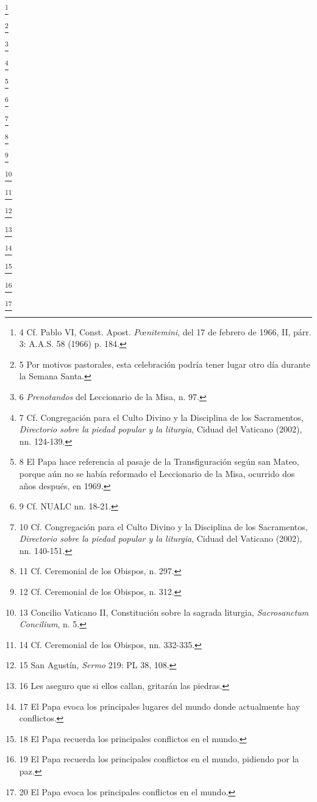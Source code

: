 					\footnote{4 Cf. Pablo VI, Const. Apost. \textit{P}œ\textit{nitemini}, del 17 de febrero de 1966, II, párr. 3: A.A.S. 58 (1966) p. 184.}
			
					\footnote{5 Por motivos pastorales, esta celebración podría tener lugar otro día durante la Semana Santa.}
			
					\footnote{6 \textit{Prenotandos} del Leccionario de la Misa, n. 97.}
			
					\footnote{7 Cf. Congregación para el Culto Divino y la Disciplina de los Sacramentos, \textit{Directorio sobre la piedad popular y la liturgia}, Ciduad del Vaticano (2002), nn. 124-139.}
			
					\footnote{8 El Papa hace referencia al pasaje de la Transfiguración según san Mateo, porque aún no se había reformado el Leccionario de la Misa, ocurrido dos años después, en 1969.}
			
					\footnote{9 Cf. NUALC nn. 18-21.}
			
					\footnote{10 Cf. Congregación para el Culto Divino y la Disciplina de los Sacramentos, \textit{Directorio sobre la piedad popular y la liturgia}, Ciduad del Vaticano (2002), nn. 140-151.}
			
					\footnote{11 Cf. Ceremonial de los Obispos, n. 297.}
			
					\footnote{12 Cf. Ceremonial de los Obispos, n. 312.}
			
					\footnote{13 Concilio Vaticano II, Constitución sobre la sagrada liturgia, \textit{Sacrosanctum Concilium}, n. 5.}
			
					\footnote{14 Cf. Ceremonial de los Obispos, nn. 332-335. }
			
					\footnote{15 San Agustín, \textit{Sermo} 219: PL 38, 108.}
			
					\footnote{16 Les aseguro que si ellos callan, gritarán las piedras.}
			
					\footnote{17 El Papa evoca los principales lugares del mundo donde actualmente hay conflictos.}
			
					\footnote{18 El Papa recuerda los principales conflictos en el mundo.}
			
					\footnote{19 El Papa recuerda los principales conflictos en el mundo, pidiendo por la paz.}
			
					\footnote{20 El Papa evoca los principales conflictos en el mundo.}
			